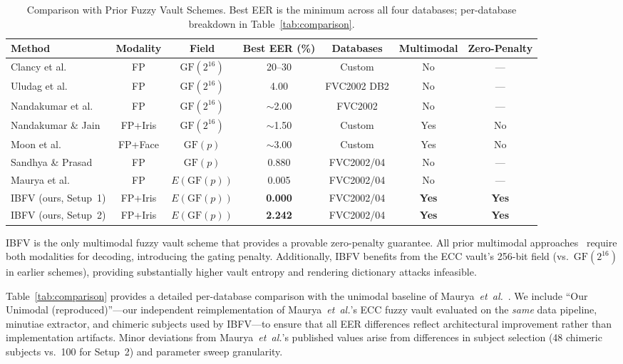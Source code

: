 \documentclass[3p,twocolumn]{elsarticle}
\newcommand{\IBFV}{\textsf{IBFV}}
\newcommand{\GFp}{\mathrm{GF}(p)}
\begin{document}
\begin{table}[t]
\centering
\caption{Comparison with Prior Fuzzy Vault Schemes. Best EER is the minimum across all four databases; per-database breakdown in Table~\ref{tab:comparison}.}
\label{tab:comparison_extended}
\begin{tabular}{@{}l c c c c c c@{}}
\toprule
\textbf{Method} & \textbf{Modality} & \textbf{Field} & \textbf{Best EER (\%)} & \textbf{Databases} & \textbf{Multimodal} & \textbf{Zero-Penalty} \\
\midrule
Clancy et al.~\cite{clancy2003secure} & FP & $\text{GF}(2^{16})$ & 20--30 & Custom & No & --- \\
Uludag et al.~\cite{uludag2005fuzzy} & FP & $\text{GF}(2^{16})$ & 4.00 & FVC2002 DB2 & No & --- \\
Nandakumar et al.~\cite{nandakumar2007fuzzy} & FP & $\text{GF}(2^{16})$ & $\sim$2.00 & FVC2002 & No & --- \\
Nandakumar \& Jain~\cite{nandakumar2008multibiometric} & FP+Iris & $\text{GF}(2^{16})$ & $\sim$1.50 & Custom & Yes & No \\
Moon et al.~\cite{moon2010multibiometric} & FP+Face & $\text{GF}(p)$ & $\sim$3.00 & Custom & Yes & No \\
Sandhya \& Prasad~\cite{sandhya2017fingerprint} & FP & $\text{GF}(p)$ & 0.880 & FVC2002/04 & No & --- \\
Maurya et al.~\cite{maurya2025enhancing} & FP & $E(\GFp{})$ & 0.005 & FVC2002/04 & No & --- \\
\midrule
\IBFV{} (ours, Setup~1) & FP+Iris & $E(\GFp{})$ & \textbf{0.000} & FVC2002/04 & \textbf{Yes} & \textbf{Yes} \\
\IBFV{} (ours, Setup~2) & FP+Iris & $E(\GFp{})$ & \textbf{2.242} & FVC2002/04 & \textbf{Yes} & \textbf{Yes} \\
\bottomrule
\end{tabular}
\end{table}

\IBFV{} is the only multimodal fuzzy vault scheme that provides a provable zero-penalty guarantee. All prior multimodal approaches~\cite{nandakumar2008multibiometric,moon2010multibiometric} require both modalities for decoding, introducing the gating penalty. Additionally, \IBFV{} benefits from the ECC vault's 256-bit field (vs.\ $\text{GF}(2^{16})$ in earlier schemes), providing substantially higher vault entropy and rendering dictionary attacks infeasible.

Table~\ref{tab:comparison} provides a detailed per-database comparison with the unimodal baseline of Maurya~\textit{et~al.}~\cite{maurya2025enhancing}. We include ``Our Unimodal (reproduced)''---our independent reimplementation of Maurya~\textit{et~al.}'s ECC fuzzy vault evaluated on the \emph{same} data pipeline, minutiae extractor, and chimeric subjects used by \IBFV{}---to ensure that all EER differences reflect architectural improvement rather than implementation artifacts. Minor deviations from Maurya~\textit{et~al.}'s published values arise from differences in subject selection (48 chimeric subjects vs.\ 100 for Setup~2) and parameter sweep granularity.
\end{document}
